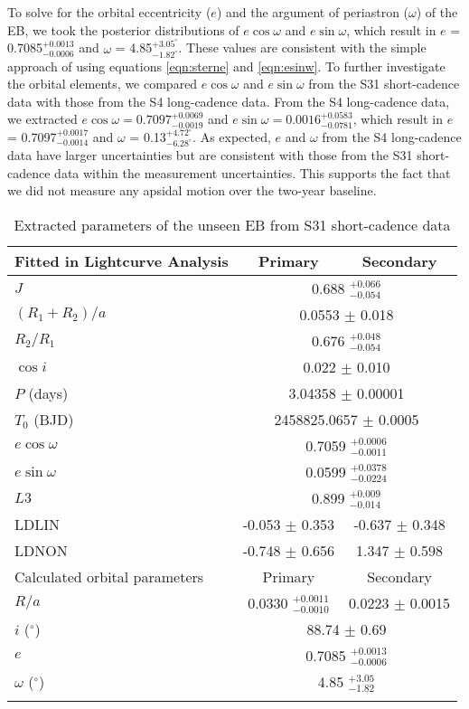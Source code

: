 \documentclass[fleqn,usenatbib]{mnras} %
\begin{document}
To solve for the orbital eccentricity ($e$) and the argument of periastron ($\omega$) of the EB, we took the posterior distributions of $e \cos{\omega}$ and $e \sin{\omega}$, which result in $e$ = 0.7085$^{+0.0013}_{-0.0006}$ and $\omega$ = 4.85$^{+3.05^\circ}_{-1.82^\circ}$. These values are consistent with the simple approach of using equations \ref{eqn:sterne} and \ref{eqn:esinw}. To further investigate the orbital elements, we compared $e \cos{\omega}$ and $e \sin{\omega}$ from the S31 short-cadence data with those from the S4 long-cadence data. From the S4 long-cadence data, we extracted $e \cos{\omega} = 0.7097^{+0.0069}_{-0.0019}$ and $e \sin{\omega} = 0.0016^{+0.0583}_{-0.0781}$, which result in $e$ = 0.7097$^{+0.0017}_{-0.0014}$ and $\omega$ =  0.13$^{+4.72^\circ}_{-6.28^\circ}$. As expected, $e$ and $\omega$ from the S4 long-cadence data have larger uncertainties but are consistent with those from the S31 short-cadence data within the measurement uncertainties. This supports the fact that we did not measure any apsidal motion over the two-year baseline.

\begin{table}
\begin{center}
\caption{Extracted parameters of the unseen EB from S31 short-cadence data}
\begin{tabular}{l c c}
\hline
Fitted in Lightcurve Analysis & Primary & Secondary\\
\hline
$J$ & \multicolumn{2}{c}{0.688 $^{+0.066}_{-0.054}$ } \\
$(R_1 + R_2)/a$ & \multicolumn{2}{c}{0.0553 $\pm$ 0.018 } \\
$R_2/R_1$ & \multicolumn{2}{c}{0.676 $^{+0.048}_{-0.054}$ } \\
$\cos{i}$ & \multicolumn{2}{c}{0.022 $\pm$ 0.010} \\
$P$ (days) & \multicolumn{2}{c}{3.04358 $\pm$ 0.00001} \\
$T_0$ (BJD) & \multicolumn{2}{c}{2458825.0657 $\pm$ 0.0005} \\
$e \cos{\omega}$ & \multicolumn{2}{c}{0.7059 $^{+0.0006}_{-0.0011}$} \\
$e \sin{\omega}$ & \multicolumn{2}{c}{0.0599 $^{+0.0378}_{-0.0224}$} \\
$L3$ & \multicolumn{2}{c}{0.899 $^{+0.009}_{-0.014}$}\\
LDLIN & -0.053 $\pm$ 0.353 & -0.637 $\pm$ 0.348 \\
LDNON & -0.748 $\pm$ 0.656 & 1.347 $\pm$ 0.598  \\
\hline
Calculated orbital parameters & Primary & Secondary\\
\hline
$R/a$ & 0.0330 $^{+0.0011}_{-0.0010}$ & 0.0223 $\pm$ 0.0015  \\
$i$ ($^\circ$) & \multicolumn{2}{c}{ 88.74 $\pm$ 0.69}  \\
$e$ & \multicolumn{2}{c}{0.7085 $^{+0.0013}_{-0.0006}$}\\
$\omega$ ($^\circ$) & \multicolumn{2}{c}{4.85 $^{+3.05}_{-1.82}$} \\
\hline
\label{tab:fitted_parameters}
\end{tabular}
\end{center}
\end{table}
\end{document}

